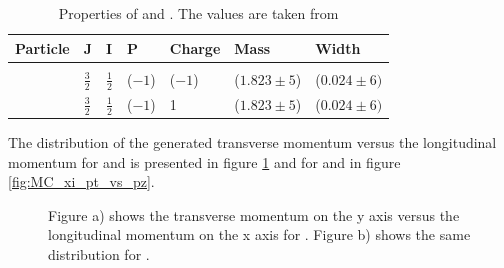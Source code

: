\begin{table}[htbp]
	\centering
	\caption{Properties of \excitedcascade and \excitedanticascade. The values are taken from \cite{PDG}}
	\label{tab:eventgeneration_Xivalues}
	\begin{tabular}{lllllll}
		\hline
		Particle & J & I & P & Charge & Mass  & Width \\
		\hline
		\hline
		&&&&&&\\
		\excitedcascade & $\frac{3}{2}$ & $\frac{1}{2}$ & ($-1$) & ($-1$) & ($1.823 \pm 5$) \massunit & ($0.024 \pm 6) $ \massunit \\
		\excitedanticascade & $\frac{3}{2}$ & $\frac{1}{2}$ & ($-1$) & 1 & ($1.823 \pm 5$) \massunit & ($0.024 \pm 6) $ \massunit\\
		\hline
		  
	\end{tabular}
\end{table}

The distribution of the generated transverse momentum versus the longitudinal momentum for \lam and \alam is presented in figure \ref{fig:MC_lambda0_pt_vs_pz} and for \anticascade and \excitedcascade in figure \ref{fig:MC_xi_pt_vs_pz}.\\


\begin{figure}
	\caption{\propose Figure a) shows the transverse momentum on the y axis versus the longitudinal momentum on the x axis for \lam. Figure b) 
			shows the same distribution for \alam.}
	\label{fig:MC_lambda0_pt_vs_pz}
\end{figure}


